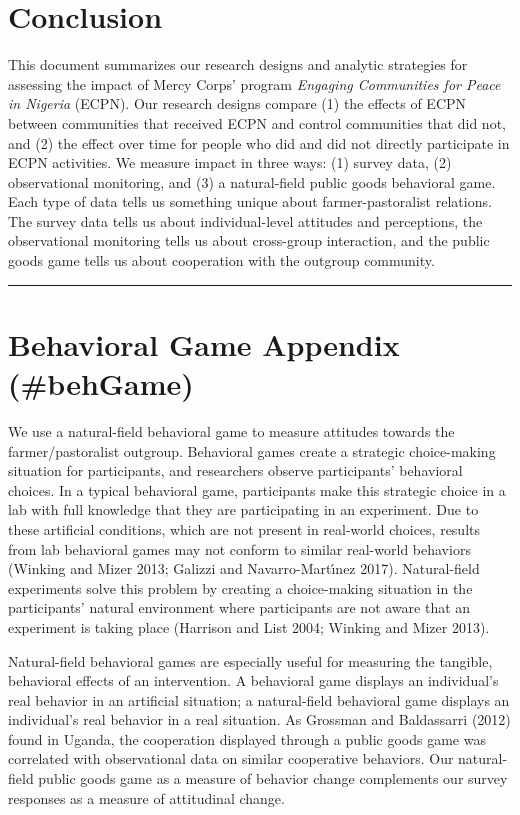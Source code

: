 \documentclass[
]{article}
\begin{document}
\hypertarget{conclusion}{%
\section{Conclusion}\label{conclusion}}

This document summarizes our research designs and analytic strategies
for assessing the impact of Mercy Corps' program \emph{Engaging
Communities for Peace in Nigeria} (ECPN). Our research designs compare
(1) the effects of ECPN between communities that received ECPN and
control communities that did not, and (2) the effect over time for
people who did and did not directly participate in ECPN activities. We
measure impact in three ways: (1) survey data, (2) observational
monitoring, and (3) a natural-field public goods behavioral game. Each
type of data tells us something unique about farmer-pastoralist
relations. The survey data tells us about individual-level attitudes and
perceptions, the observational monitoring tells us about cross-group
interaction, and the public goods game tells us about cooperation with
the outgroup community.

\begin{center}\rule{0.5\linewidth}{0.5pt}\end{center}

\hypertarget{behavioral-game-appendix-behgame}{%
\section{Behavioral Game Appendix
(\#behGame)}\label{behavioral-game-appendix-behgame}}

We use a natural-field behavioral game to measure attitudes towards the
farmer/pastoralist outgroup. Behavioral games create a strategic
choice-making situation for participants, and researchers observe
participants' behavioral choices. In a typical behavioral game,
participants make this strategic choice in a lab with full knowledge
that they are participating in an experiment. Due to these artificial
conditions, which are not present in real-world choices, results from
lab behavioral games may not conform to similar real-world behaviors
(Winking and Mizer 2013; Galizzi and Navarro-Martı́nez 2017).
Natural-field experiments solve this problem by creating a choice-making
situation in the participants' natural environment where participants
are not aware that an experiment is taking place (Harrison and List
2004; Winking and Mizer 2013).

Natural-field behavioral games are especially useful for measuring the
tangible, behavioral effects of an intervention. A behavioral game
displays an individual's real behavior in an artificial situation; a
natural-field behavioral game displays an individual's real behavior in
a real situation. As Grossman and Baldassarri (2012) found in Uganda,
the cooperation displayed through a public goods game was correlated
with observational data on similar cooperative behaviors. Our
natural-field public goods game as a measure of behavior change
complements our survey responses as a measure of attitudinal change.
\end{document}
